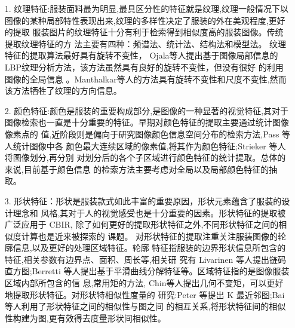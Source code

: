 \begin{itemize}
\item[1.]纹理特征:服装面料最为明显,最具区分性的特征就是纹理,纹理一般情况下以
图像的某种局部特性表现出来,纹理的多样性决定了服装的外在美观程度,更好的提取
服装图片的纹理特征十分有利于检索得到相似度高的服装图像。传统提取纹理特征的方
法主要有四种：频谱法、统计法、结构法和模型法。
纹理特征的提取算法最好具有旋转不变性， Ojala等人提出基于图像局部信息的LBP纹理分析方法，该方法虽然具有良好的旋转不变性，但没有很好
的利用图像的全局信息\cite{ojala2002multiresolution}
。Manthalkar等人的方法具有旋转不变性和尺度不变性,然而
该方法牺牲了纹理的方向信息\cite{manthalkar2003rotation}。

\item[2.] 颜色特征:颜色是服装的重要构成部分,是图像的一种显著的视觉特征,其对于
图像检索也一直是十分重要的特征。早期对颜色特征的提取主要通过统计图像像素点的
值,近阶段则是偏向于研究图像颜色信息空间分布的检索方法,Pass 等人统计图像中各
颜色最大连续区域的像素值,将其作为颜色特征\cite{pass1996comparing};Strieker 等人将图像划分,再分别
对划分后的各个子区域进行颜色特征的统计提取\cite{stricker1997spectral}。总体的来说,目前基于颜色信息
的检索方法主要考虑对全局以及局部颜色特征的抽取。

\item[3.] 形状特征：形状是服装款式如此丰富的重要原因，形状元素蕴含了服装的设计理念和
风格,其对于人的视觉感受也是十分重要的因素。形状特征的提取被广泛应用于 CBIR,
除了如何更好的提取形状特征之外,不同形状特征之间的相似度计算也是近来被探索的
课题。
对形状特征的提取注重关注服装图像的轮廓信息,以及更好的处理区域特征。轮廓
特征指服装的边界形状信息所包含的特征,相关参数有边界点、面积、周长等,相关研
究有 Livarinen 等人提出链码直方图\cite{iivarinen1997comparison};Berretti
等人提出基于平滑曲线分解特征等\cite{berretti2000retrieval}。区域特征指的是图像服装区域内部所包含的信
息,常用矩的方法, Chin等人提出几何不变矩，可以更好地提取形状特征\cite{teh1988image}。对形状特相似性度量的
研究:Peter 等提出 K 最近邻图\cite{kontschieder2009beyond};Bai 等人利用了形状特征之间的相似性与图之间
的相互关系,将形状特征间的相似性构建为图,更有效得去度量形状间相似性\cite{bai2010learning}。
\end{itemize}

